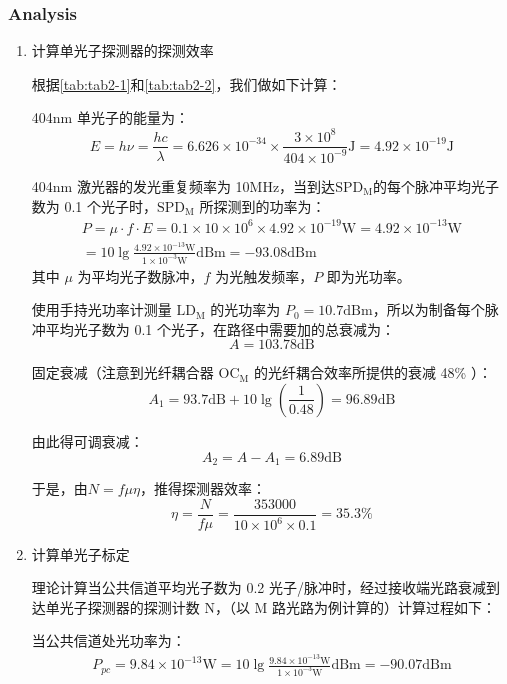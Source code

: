 \subsubsection{Analysis}
\begin{enumerate}
	\item 计算单光子探测器的探测效率
	
	根据\cref{tab:tab2-1}和\cref{tab:tab2-2}，我们做如下计算：
	
	404nm 单光子的能量为：
	$$ E = h \nu = \frac{h c}{\lambda} = 6.626 \times 10^{-34} \times \frac{3 \times 10^{8}}{404 \times 10^{-9}} \mathrm{J} = 4.92 \times 10^{-19} \mathrm{J} $$
	
	404nm 激光器的发光重复频率为 10MHz，当到达$\mathrm{SPD_M}$的每个脉冲平均光子数为 0.1 个光子时，$\mathrm{SPD_M}$ 所探测到的功率为：
	\begin{align*}
		P = \mu \cdot f \cdot E = 0.1 \times 10 \times 10^{6} \times 4.92 \times 10^{-19} \mathrm{W} = 4.92 \times 10^{-13} \mathrm{W}	\\
		= 10 \lg \frac{4.92 \times 10^{-13} \mathrm{W}}{1 \times 10^{-3} \mathrm{W}} \mathrm{dBm} = -93.08 \mathrm{dBm}
	\end{align*}
	其中 $\mu$ 为平均光子数脉冲，$f$ 为光触发频率，$P$ 即为光功率。
	
	使用手持光功率计测量 $\mathrm{LD_M}$ 的光功率为 $P_0 = 10.7 \mathrm{dBm}$，所以为制备每个脉冲平均光子数为 0.1 个光子，在路径中需要加的总衰减为：
	$$
	A = 103.78\text{dB}
	$$
	
	固定衰减（注意到光纤耦合器 $\mathrm{OC_M}$ 的光纤耦合效率所提供的衰减 48\% ）：
	$$
	A_1 = 93.7\text{dB} + 10\lg(\frac{1}{0.48}) = 96.89\text{dB}
	$$
	
	由此得可调衰减：
	$$
	A_2 = A - A_1 = 6.89\text{dB}
	$$
	
	于是，由$N = f\mu\eta$，推得探测器效率：
	$$
	\eta = \frac{N}{f\mu} = \frac{353000}{10\times10^6\times0.1} = 35.3\%
	$$
	
	\item 计算单光子标定
	
	理论计算当公共信道平均光子数为 0.2 光子/脉冲时，经过接收端光路衰减到达单光子探测器的探测计数 N，（以 M 路光路为例计算的）计算过程如下：
	
	当公共信道处光功率为：
	\begin{align*}
		P_{pc} = 9.84 \times 10^{-13} \mathrm{W} = 10 \lg \frac{9.84 \times 10^{-13} \mathrm{W}}{1 \times 10^{-3} \mathrm{W}} \mathrm{dBm} = -90.07 \mathrm{dBm}
	\end{align*}
		

\end{enumerate}
